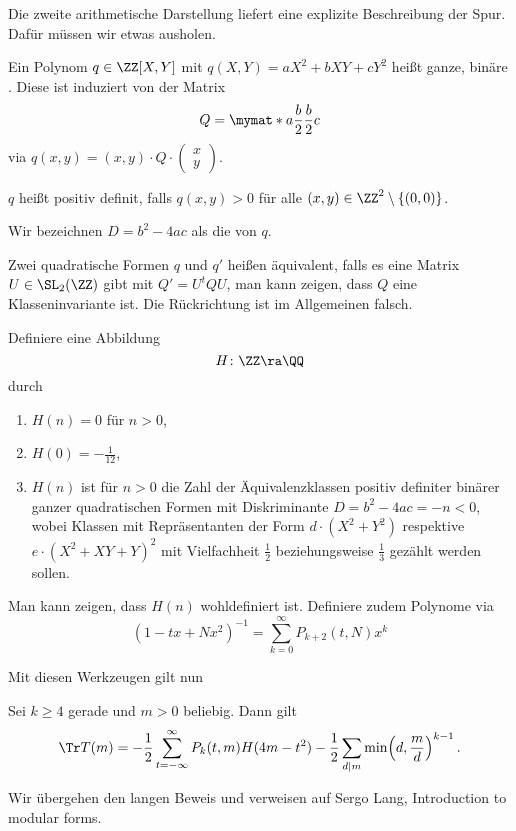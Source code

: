 Die zweite arithmetische Darstellung liefert eine explizite Beschreibung der Spur.
Dafür müssen wir etwas ausholen.

\begin{defi}
	Ein Polynom $q \in \ZZ[X, Y]$ mit $q(X,Y) = aX^2 + bXY + cY^2$ heißt ganze, binäre .
	Diese ist induziert von der Matrix
	\[
		Q = \mymat*{a}{\frac{b}{2}}{\frac{b}{2}}{c}
	\]
	via $q(x,y) = (x, y) \cdot Q \cdot (\begin{smallmatrix} x \\ y \end{smallmatrix})$.
	
	$q$ heißt positiv definit, falls $q(x,y) > 0$ für alle $(x,y) \in \ZZ^2\setminus\{(0,0)\}$.
	
	Wir bezeichnen $D = b^2 - 4ac$ als die  von $q$.
	
	Zwei quadratische Formen $q$ und $q'$ heißen äquivalent, falls es eine Matrix $U \in \SL_2(\ZZ)$ gibt mit $Q' = U^t Q U$, man kann zeigen, dass $Q$ eine Klasseninvariante ist.
	Die Rückrichtung ist im Allgemeinen falsch.
	
	Definiere eine Abbildung
	\[
		H\colon \ZZ \ra \QQ
	\]
	durch
	\begin{enumerate}
		\item $H(n) = 0$ für $n > 0$,
		\item $H(0) = - \frac{1}{12}$,
		\item $H(n)$ ist für $n > 0$ die Zahl der Äquivalenzklassen positiv definiter binärer ganzer quadratischen Formen mit Diskriminante $D = b^2-4ac = -n < 0$, wobei Klassen mit Repräsentanten der Form $d\cdot (X^2 + Y^2)$ respektive $e \cdot (X^2 + XY + Y)^2$ mit Vielfachheit $\frac{1}{2}$ beziehungsweise $\frac{1}{3}$ gezählt werden sollen.
	\end{enumerate}
	Man kann zeigen, dass $H(n)$ wohldefiniert ist.
	Definiere zudem Polynome via
	\[
		(1-tx+Nx^2)^{-1} = \sum_{k=0}^\infty P_{k+2}(t,N) x^k
	\]
\end{defi}

Mit diesen Werkzeugen gilt nun
\begin{theorem}
	Sei $k \geq 4$ gerade und $m > 0$ beliebig. Dann gilt
	\[
		\Tr T(m) = -\frac{1}{2} \sum_{t=-\infty}^\infty P_k(t,m) H(4m-t^2) - \frac{1}{2} \sum_{d|m} \min\Bigl(d, \frac{m}{d}\Bigr)^{k-1}\,.
	\]
\end{theorem}

\begin{bewe}
	Wir übergehen den langen Beweis und verweisen auf Sergo Lang, Introduction to modular forms.
\end{bewe}